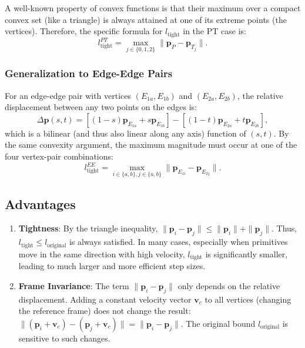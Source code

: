 \documentclass[acmtog,anonymous,review,screen,nonacm]{acmart}
\begin{document}
A well-known property of convex functions is that their maximum over a compact convex set (like a triangle) is always attained at one of its extreme points (the vertices). Therefore, the specific formula for $l_{\text{tight}}$ in the PT case is:
\begin{equation}
    l_{\text{tight}}^{PT} = \max_{j \in \{0,1,2\}} \| \mathbf{p}_P - \mathbf{p}_{T_j} \|.
\end{equation}

\subsubsection{Generalization to Edge-Edge Pairs}
For an edge-edge pair with vertices $(E_{1a}, E_{1b})$ and $(E_{2a}, E_{2b})$, the relative displacement between any two points on the edges is:
\begin{equation}
    \Delta \mathbf{p}(s, t) = [(1-s)\mathbf{p}_{E_{1a}} + s\mathbf{p}_{E_{1b}}] - [(1-t)\mathbf{p}_{E_{2a}} + t\mathbf{p}_{E_{2b}}],
\end{equation}
which is a bilinear (and thus also linear along any axis) function of $(s, t)$. By the same convexity argument, the maximum magnitude must occur at one of the four vertex-pair combinations:
\begin{equation}
    l_{\text{tight}}^{EE} = \max_{i \in \{a, b\}, j \in \{a, b\}} \| \mathbf{p}_{E_{1i}} - \mathbf{p}_{E_{2j}} \|.
\end{equation}

\subsection{Advantages}
\begin{enumerate}
    \item \textbf{Tightness}: By the triangle inequality, $\|\mathbf{p}_i - \mathbf{p}_j\| \le \|\mathbf{p}_i\| + \|\mathbf{p}_j\|$. Thus, $l_{\text{tight}} \le l_{\text{original}}$ is always satisfied. In many cases, especially when primitives move in the same direction with high velocity, $l_{\text{tight}}$ is significantly smaller, leading to much larger and more efficient step sizes.
    \item \textbf{Frame Invariance}: The term $\|\mathbf{p}_i - \mathbf{p}_j\|$ only depends on the relative displacement. Adding a constant velocity vector $\mathbf{v}_c$ to all vertices (changing the reference frame) does not change the result: $\|(\mathbf{p}_i + \mathbf{v}_c) - (\mathbf{p}_j + \mathbf{v}_c)\| = \|\mathbf{p}_i - \mathbf{p}_j\|$. The original bound $l_{\text{original}}$ is sensitive to such changes.
\end{enumerate}



\end{document}
